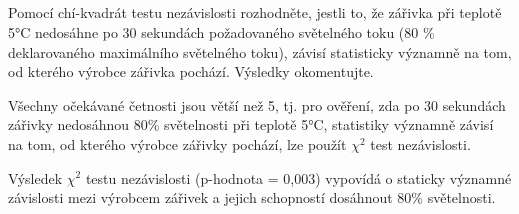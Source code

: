 \documentclass[czech]{article}%
\begin{document}
\newpage
\subsection{}
Pomocí chí-kvadrát testu nezávislosti rozhodněte, jestli to, 
že zářivka při teplotě 5°C nedosáhne po 30 sekundách požadovaného světelného toku 
(80 \% deklarovaného maximálního světelného toku), závisí statisticky významně 
na tom, od kterého výrobce zářivka pochází. Výsledky okomentujte.

Všechny očekávané četnosti jsou větší než 5, tj. pro ověření, 
zda po 30 sekundách zářivky nedosáhnou 80\% světelnosti při teplotě 5°C, 
statistiky významně závisí na tom, od kterého výrobce zářivky pochází, lze použít
$\chi^2$ test nezávislosti.

Výsledek $\chi^2$ testu nezávislosti (p-hodnota = 0,003) vypovídá o staticky významné 
závislosti mezi výrobcem zářivek a jejich schopností dosáhnout 80\% světelnosti.
\end{document}
